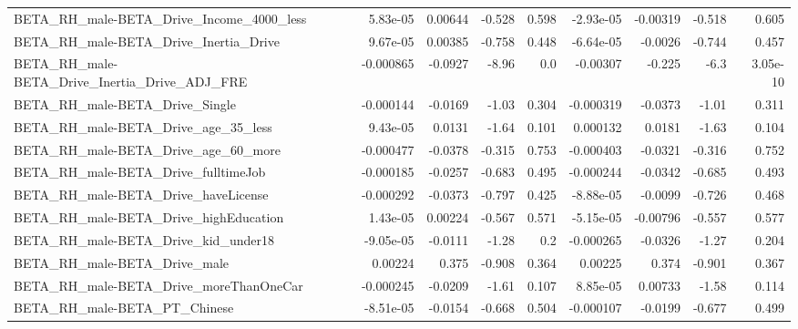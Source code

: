\begin{tabular}{lrrrrrrrr}
BETA\_RH\_male-BETA\_Drive\_Income\_4000\_less           &    5.83e-05 &      0.00644 &   -0.528 &    0.598 &  -2.93e-05 &    -0.00319 &       -0.518 &         0.605 \\
BETA\_RH\_male-BETA\_Drive\_Inertia\_Drive              &    9.67e-05 &      0.00385 &   -0.758 &    0.448 &  -6.64e-05 &     -0.0026 &       -0.744 &         0.457 \\
BETA\_RH\_male-BETA\_Drive\_Inertia\_Drive\_ADJ\_FRE      &   -0.000865 &      -0.0927 &    -8.96 &      0.0 &   -0.00307 &      -0.225 &         -6.3 &      3.05e-10 \\
BETA\_RH\_male-BETA\_Drive\_Single                     &   -0.000144 &      -0.0169 &    -1.03 &    0.304 &  -0.000319 &     -0.0373 &        -1.01 &         0.311 \\
BETA\_RH\_male-BETA\_Drive\_age\_35\_less                &    9.43e-05 &       0.0131 &    -1.64 &    0.101 &   0.000132 &      0.0181 &        -1.63 &         0.104 \\
BETA\_RH\_male-BETA\_Drive\_age\_60\_more                &   -0.000477 &      -0.0378 &   -0.315 &    0.753 &  -0.000403 &     -0.0321 &       -0.316 &         0.752 \\
BETA\_RH\_male-BETA\_Drive\_fulltimeJob                &   -0.000185 &      -0.0257 &   -0.683 &    0.495 &  -0.000244 &     -0.0342 &       -0.685 &         0.493 \\
BETA\_RH\_male-BETA\_Drive\_haveLicense                &   -0.000292 &      -0.0373 &   -0.797 &    0.425 &  -8.88e-05 &     -0.0099 &       -0.726 &         0.468 \\
BETA\_RH\_male-BETA\_Drive\_highEducation              &    1.43e-05 &      0.00224 &   -0.567 &    0.571 &  -5.15e-05 &    -0.00796 &       -0.557 &         0.577 \\
BETA\_RH\_male-BETA\_Drive\_kid\_under18                &   -9.05e-05 &      -0.0111 &    -1.28 &      0.2 &  -0.000265 &     -0.0326 &        -1.27 &         0.204 \\
BETA\_RH\_male-BETA\_Drive\_male                       &     0.00224 &        0.375 &   -0.908 &    0.364 &    0.00225 &       0.374 &       -0.901 &         0.367 \\
BETA\_RH\_male-BETA\_Drive\_moreThanOneCar             &   -0.000245 &      -0.0209 &    -1.61 &    0.107 &   8.85e-05 &     0.00733 &        -1.58 &         0.114 \\
BETA\_RH\_male-BETA\_PT\_Chinese                       &   -8.51e-05 &      -0.0154 &   -0.668 &    0.504 &  -0.000107 &     -0.0199 &       -0.677 &         0.499 \\

\end{tabular}
